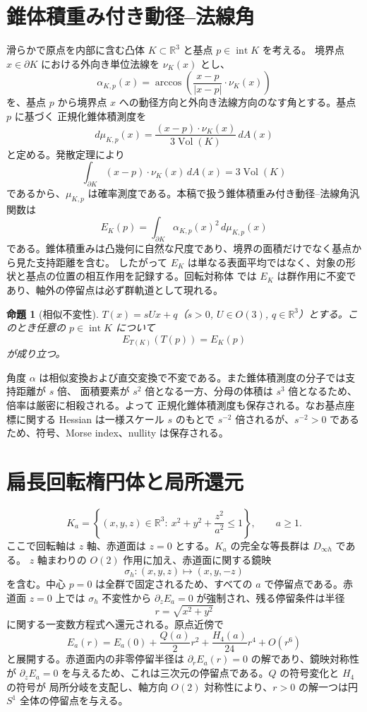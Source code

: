 \documentclass[a4paper,11pt]{ltjsarticle}
\theoremstyle{plain}
\newtheorem{prop}{命題}[section]
\theoremstyle{definition}
\begin{document}
\section{錐体積重み付き動径–法線角}

滑らかで原点を内部に含む凸体 \(K\subset\mathbb{R}^3\) と基点 \(p\in\operatorname{int}K\) を考える。
境界点 \(x\in\partial K\) における外向き単位法線を \(\nu_K(x)\) とし、
\[
\alpha_{K,p}(x)=\arccos\!\left(\frac{x-p}{\lvert x-p\rvert}\cdot\nu_K(x)\right)
\]
を、基点 \(p\) から境界点 \(x\) への動径方向と外向き法線方向のなす角とする。基点 \(p\) に基づく
正規化錐体積測度を
\[
d\mu_{K,p}(x)=\frac{(x-p)\cdot\nu_K(x)}{3\operatorname{Vol}(K)}\,dA(x)
\]
と定める。発散定理により
\[
\int_{\partial K}(x-p)\cdot\nu_K(x)\,dA(x)=3\operatorname{Vol}(K)
\]
であるから、\(\mu_{K,p}\) は確率測度である。本稿で扱う錐体積重み付き動径–法線角汎関数は
\[
E_K(p)=\int_{\partial K}\alpha_{K,p}(x)^2\,d\mu_{K,p}(x)
\]
である。錐体積重みは凸幾何に自然な尺度であり、境界の面積だけでなく基点から見た支持距離を含む。
したがって \(E_K\) は単なる表面平均ではなく、対象の形状と基点の位置の相互作用を記録する。回転対称体
では \(E_K\) は群作用に不変であり、軸外の停留点は必ず群軌道として現れる。

\begin{prop}[相似不変性]
\label{prop:similarity}
\(T(x)=sUx+q\)（\(s>0\), \(U\in O(3)\), \(q\in\mathbb{R}^3\)）とする。このとき任意の
\(p\in\operatorname{int}K\) について
\[
E_{T(K)}(T(p))=E_K(p)
\]
が成り立つ。
\end{prop}

角度 \(\alpha\) は相似変換および直交変換で不変である。また錐体積測度の分子では支持距離が \(s\) 倍、
面積要素が \(s^2\) 倍となる一方、分母の体積は \(s^3\) 倍となるため、倍率は厳密に相殺される。よって
正規化錐体積測度も保存される。なお基点座標に関する Hessian は一様スケール \(s\) のもとで
\(s^{-2}\) 倍されるが、\(s^{-2}>0\) であるため、符号、Morse index、nullity は保存される。

\section{扁長回転楕円体と局所還元}

\[
K_a=\left\{(x,y,z)\in\mathbb{R}^3:\ x^2+y^2+\frac{z^2}{a^2}\le 1\right\},\qquad a\ge 1 .
\]
ここで回転軸は \(z\) 軸、赤道面は \(z=0\) とする。\(K_a\) の完全な等長群は \(D_{\infty h}\) である。
\(z\) 軸まわりの \(O(2)\) 作用に加え、赤道面に関する鏡映
\[
\sigma_h:(x,y,z)\mapsto(x,y,-z)
\]
を含む。中心 \(p=0\) は全群で固定されるため、すべての \(a\) で停留点である。赤道面 \(z=0\) 上では
\(\sigma_h\) 不変性から \(\partial_zE_a=0\) が強制され、残る停留条件は半径
\[
r=\sqrt{x^2+y^2}
\]
に関する一変数方程式へ還元される。原点近傍で
\[
E_a(r)=E_a(0)+\frac{Q(a)}{2}r^2+\frac{H_4(a)}{24}r^4+O(r^6)
\]
と展開する。赤道面内の非零停留半径は \(\partial_rE_a(r)=0\) の解であり、鏡映対称性が
\(\partial_zE_a=0\) を与えるため、これは三次元の停留点である。\(Q\) の符号変化と \(H_4\) の符号が
局所分岐を支配し、軸方向 \(O(2)\) 対称性により、\(r>0\) の解一つは円 \(S^1\) 全体の停留点を与える。
\end{document}
